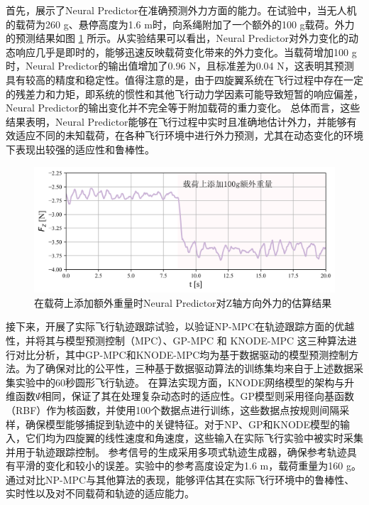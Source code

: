 \documentclass[lang=chs, degree=master, blindreview=true, winfonts=true]{yanputhesis}
\begin{document}
首先，展示了Neural Predictor在准确预测外力方面的能力。在试验中，当无人机的载荷为260 g、悬停高度为1.6 m时，向系绳附加了一个额外的100 g载荷。外力的预测结果如图 \ref{force} 所示。从实验结果可以看出，Neural Predictor对外力变化的动态响应几乎是即时的，能够迅速反映载荷变化带来的外力变化。当载荷增加100 g时，Neural Predictor的输出值增加了0.96 N，且标准差为0.04 N，这表明其预测具有较高的精度和稳定性。值得注意的是，由于四旋翼系统在飞行过程中存在一定的残差力和力矩，即系统的惯性和其他飞行动力学因素可能导致短暂的响应偏差，Neural Predictor的输出变化并不完全等于附加载荷的重力变化。
总体而言，这些结果表明，Neural Predictor能够在飞行过程中实时且准确地估计外力，并能够有效适应不同的未知载荷，在各种飞行环境中进行外力预测，尤其在动态变化的环境下表现出较强的适应性和鲁棒性。



\begin{figure}[hbt!]
	\centering
	\includegraphics[width=38pc]{picture/kk/force.png} 
	\caption{在载荷上添加额外重量时Neural Predictor对Z轴方向外力的估算结果} 
	\label{force}
\end{figure}

接下来，开展了实际飞行轨迹跟踪试验，以验证NP-MPC在轨迹跟踪方面的优越性，并将其与模型预测控制（MPC）、GP-MPC \cite{torrente2021data} 和 KNODE-MPC \cite{Chee2022} 这三种算法进行对比分析，其中GP-MPC和KNODE-MPC均为基于数据驱动的模型预测控制方法。为了确保对比的公平性，三种基于数据驱动算法的训练集均来自于上述数据采集实验中的60秒圆形飞行轨迹。
在算法实现方面，KNODE网络模型的架构与升维函数$\Psi$相同，保证了其在处理复杂动态时的适应性。GP模型则采用径向基函数（RBF）作为核函数，并使用100个数据点进行训练，这些数据点按规则间隔采样，确保模型能够捕捉到轨迹中的关键特征。对于NP、GP和KNODE模型的输入，它们均为四旋翼的线性速度和角速度，这些输入在实际飞行实验中被实时采集并用于轨迹跟踪控制。
参考信号的生成采用多项式轨迹生成器，确保参考轨迹具有平滑的变化和较小的误差。实验中的参考高度设定为1.6 m，载荷重量为160 g。通过对比NP-MPC与其他算法的表现，能够评估其在实际飞行环境中的鲁棒性、实时性以及对不同载荷和轨迹的适应能力。
\end{document}
